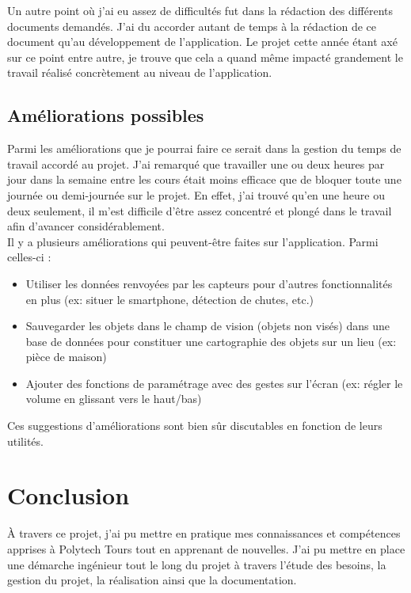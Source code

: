 \documentclass[UTF8]{EPURapport}
\begin{document}
Un autre point où j'ai eu assez de difficultés fut dans la rédaction des différents documents demandés. J'ai du accorder autant de temps à la rédaction de ce document qu'au développement de l'application. Le projet cette année étant axé sur ce point entre autre, je trouve que cela a quand même impacté grandement le travail réalisé concrètement au niveau de l'application.

\section{Améliorations possibles}

Parmi les améliorations que je pourrai faire ce serait dans la gestion du temps de travail accordé au projet. J'ai remarqué que travailler une ou deux heures par jour dans la semaine entre les cours était moins efficace que de bloquer toute une journée ou demi-journée sur le projet. En effet, j'ai trouvé qu'en une heure ou deux seulement, il m'est difficile d'être assez concentré et plongé dans le travail afin d'avancer considérablement.\\

Il y a plusieurs améliorations qui peuvent-être faites sur l'application. Parmi celles-ci :\\

\begin{itemize}
  \item Utiliser les données renvoyées par les capteurs pour d'autres fonctionnalités en plus (ex: situer le smartphone, détection de chutes, etc.)
  \item Sauvegarder les objets dans le champ de vision (objets non visés) dans une base de données pour constituer une cartographie des objets sur un lieu (ex: pièce de maison)
  \item Ajouter des fonctions de paramétrage avec des gestes sur l'écran (ex: régler le volume en glissant vers le haut/bas)\\
\end{itemize}

Ces suggestions d'améliorations sont bien sûr discutables en fonction de leurs utilités.

\chapter{Conclusion}

À travers ce projet, j'ai pu mettre en pratique mes connaissances et compétences apprises à Polytech Tours tout en apprenant de nouvelles. J'ai pu mettre en place une démarche ingénieur tout le long du projet à travers l'étude des besoins, la gestion du projet, la réalisation ainsi que la documentation. \\
\end{document}
